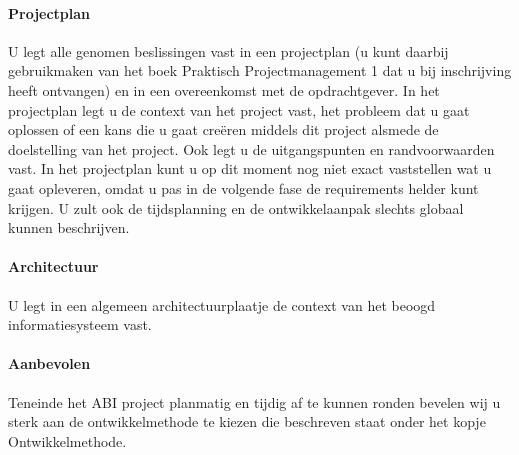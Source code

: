 \paragraph{Projectplan}
U legt alle genomen beslissingen vast in een projectplan (u kunt daarbij
gebruikmaken van het boek Praktisch Projectmanagement 1 dat u bij
inschrijving heeft ontvangen) en in een overeenkomst met de opdrachtgever. In het
projectplan legt u de context van het project vast, het probleem dat u gaat
oplossen of een kans die u gaat creëren middels dit project alsmede de doelstelling
van het project. Ook legt u de uitgangspunten en randvoorwaarden vast.
In het projectplan kunt u op dit moment nog niet exact vaststellen wat u
gaat opleveren, omdat u pas in de volgende fase de requirements
helder kunt krijgen. U zult ook de tijdsplanning en de ontwikkelaanpak
slechts globaal kunnen beschrijven.
\paragraph{Architectuur}
U legt in een algemeen architectuurplaatje de context van het beoogd
informatiesysteem vast.
\paragraph{Aanbevolen}
Teneinde het ABI project planmatig en tijdig af te kunnen ronden bevelen wij
u sterk aan de ontwikkelmethode te kiezen die beschreven staat onder het kopje
Ontwikkelmethode.

